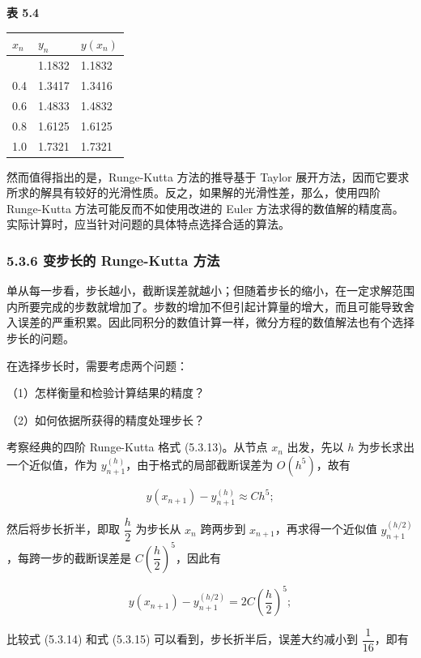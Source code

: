 \textbf{表 5.4}

{\def\LTcaptype{none} %
\begin{longtable}[]{@{}lll@{}}
\toprule\noalign{}
\(x_n\) & \(y_n\) & \(y(x_n)\) \\
\midrule\noalign{}
\endhead
\bottomrule\noalign{}
\endlastfoot
0.2 & 1.1832 & 1.1832 \\
0.4 & 1.3417 & 1.3416 \\
0.6 & 1.4833 & 1.4832 \\
0.8 & 1.6125 & 1.6125 \\
1.0 & 1.7321 & 1.7321 \\
\end{longtable}
}

然而值得指出的是，Runge-Kutta 方法的推导基于 Taylor 展开方法，因而它要求所求的解具有较好的光滑性质。反之，如果解的光滑性差，那么，使用四阶 Runge-Kutta 方法可能反而不如使用改进的 Euler 方法求得的数值解的精度高。实际计算时，应当针对问题的具体特点选择合适的算法。

\subsubsection{5.3.6 变步长的 Runge-Kutta 方法}\label{ch05a-ux53d8ux6b65ux957fux7684-runge-kutta-ux65b9ux6cd5}

单从每一步看，步长越小，截断误差就越小；但随着步长的缩小，在一定求解范围内所要完成的步数就增加了。步数的增加不但引起计算量的增大，而且可能导致舍入误差的严重积累。因此同积分的数值计算一样，微分方程的数值解法也有个选择步长的问题。

在选择步长时，需要考虑两个问题：

（1）怎样衡量和检验计算结果的精度？

（2）如何依据所获得的精度处理步长？

考察经典的四阶 Runge-Kutta 格式 (5.3.13)。从节点 \(x_n\) 出发，先以 \(h\) 为步长求出一个近似值，作为 \(y_{n+1}^{(h)}\)，由于格式的局部截断误差为 \(O(h^5)\)，故有

\[
y(x_{n+1})-y_{n+1}^{(h)}\approx Ch^5;\tag{5.3.14}
\]

然后将步长折半，即取 \(\dfrac{h}{2}\) 为步长从 \(x_n\) 跨两步到 \(x_{n+1}\)，再求得一个近似值 \(y_{n+1}^{(h/2)}\)，每跨一步的截断误差是 \(C\left(\dfrac{h}{2}\right)^5\)，因此有

\[
y(x_{n+1})-y_{n+1}^{(h/2)}=2C\left(\frac{h}{2}\right)^5;\tag{5.3.15}
\]

比较式 (5.3.14) 和式 (5.3.15) 可以看到，步长折半后，误差大约减小到 \(\dfrac{1}{16}\)，即有

